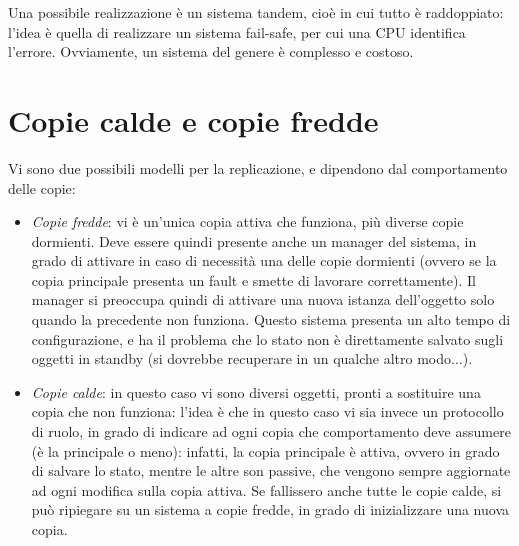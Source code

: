 Una possibile realizzazione è un sistema tandem, cioè in cui tutto è 
raddoppiato: l'idea è quella di realizzare un
sistema fail-safe, per cui una CPU identifica l'errore. Ovviamente, un sistema
del genere è complesso e costoso.
\section{Copie calde e copie fredde}
Vi sono due possibili modelli per la replicazione, e dipendono dal 
comportamento delle copie:
\begin{itemize}
 \item \textit{Copie fredde}: vi è un'unica copia attiva che funziona, più 
diverse copie dormienti. Deve essere quindi
 presente anche un manager del sistema, in grado di attivare in caso di 
necessità una delle copie dormienti (ovvero se
 la copia principale presenta un fault e smette di lavorare correttamente). Il 
manager si preoccupa quindi di attivare
 una nuova istanza dell'oggetto solo quando la precedente non funziona. Questo 
sistema presenta un alto tempo di
 configurazione, e ha il problema che lo stato non è direttamente salvato sugli 
oggetti in standby (si dovrebbe
 recuperare in un qualche altro modo...).
 \item \textit{Copie calde}: in questo caso vi sono diversi oggetti, pronti a 
sostituire una copia che non funziona:
 l'idea è che in questo caso vi sia invece un protocollo di ruolo, in grado di 
indicare ad ogni copia che comportamento
 deve assumere (è la principale o meno): infatti, la copia principale è attiva, 
ovvero in grado di salvare lo stato,
 mentre le altre son passive, che vengono sempre aggiornate ad ogni modifica 
sulla copia attiva. Se fallissero anche
 tutte le copie calde, si può ripiegare su un sistema a copie fredde, in grado 
di inizializzare una nuova copia.
\end{itemize}
